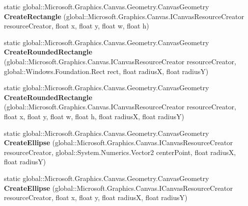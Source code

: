 \begin{DoxyCompactItemize}
\item 
\mbox{\label{class_microsoft_1_1_graphics_1_1_canvas_1_1_geometry_1_1_canvas_geometry_a09f20f98661ef071c60ef36ee6e9c383}} 
static global\+::\+Microsoft.\+Graphics.\+Canvas.\+Geometry.\+Canvas\+Geometry {\bfseries Create\+Rectangle} (global\+::\+Microsoft.\+Graphics.\+Canvas.\+I\+Canvas\+Resource\+Creator resource\+Creator, float x, float y, float w, float h)
\item 
\mbox{\label{class_microsoft_1_1_graphics_1_1_canvas_1_1_geometry_1_1_canvas_geometry_a009788642a98b2179cad9bba9b1965dd}} 
static global\+::\+Microsoft.\+Graphics.\+Canvas.\+Geometry.\+Canvas\+Geometry {\bfseries Create\+Rounded\+Rectangle} (global\+::\+Microsoft.\+Graphics.\+Canvas.\+I\+Canvas\+Resource\+Creator resource\+Creator, global\+::\+Windows.\+Foundation.\+Rect rect, float radiusX, float radiusY)
\item 
\mbox{\label{class_microsoft_1_1_graphics_1_1_canvas_1_1_geometry_1_1_canvas_geometry_a11c20ec470232154e23df2c9cb9c10dd}} 
static global\+::\+Microsoft.\+Graphics.\+Canvas.\+Geometry.\+Canvas\+Geometry {\bfseries Create\+Rounded\+Rectangle} (global\+::\+Microsoft.\+Graphics.\+Canvas.\+I\+Canvas\+Resource\+Creator resource\+Creator, float x, float y, float w, float h, float radiusX, float radiusY)
\item 
\mbox{\label{class_microsoft_1_1_graphics_1_1_canvas_1_1_geometry_1_1_canvas_geometry_a66008979f1f25a70e38f6044abf0aca6}} 
static global\+::\+Microsoft.\+Graphics.\+Canvas.\+Geometry.\+Canvas\+Geometry {\bfseries Create\+Ellipse} (global\+::\+Microsoft.\+Graphics.\+Canvas.\+I\+Canvas\+Resource\+Creator resource\+Creator, global\+::\+System.\+Numerics.\+Vector2 center\+Point, float radiusX, float radiusY)
\item 
\mbox{\label{class_microsoft_1_1_graphics_1_1_canvas_1_1_geometry_1_1_canvas_geometry_a60460178970082d9e7b6673b17fb88ec}} 
static global\+::\+Microsoft.\+Graphics.\+Canvas.\+Geometry.\+Canvas\+Geometry {\bfseries Create\+Ellipse} (global\+::\+Microsoft.\+Graphics.\+Canvas.\+I\+Canvas\+Resource\+Creator resource\+Creator, float x, float y, float radiusX, float radiusY)

\end{DoxyCompactItemize}

